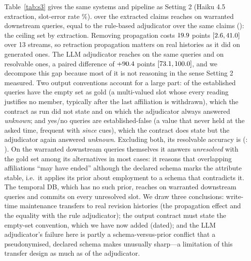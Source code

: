 Table~\ref{tab:s3} gives the same systems and pipeline as Setting 2 (Haiku 4.5 extraction, slot-error rate \sThreeExtSlot\%). \pal{} over the extracted claims reaches \sThreePalWarr{} on warranted downstream queries, equal to the rule-based adjudicator over the same claims (\sThreeRuleWarr): the ceiling set by extraction. Removing propagation costs $19.9$ points $[2.6, 41.0]$ over 13 streams, so retraction propagation matters on real histories as it did on generated ones. The LLM adjudicator reaches \sThreeLogWarr{} on the same queries and \sThreeLogRes{} on resolvable ones, a paired difference of $+90.4$ points $[73.1, 100.0]$, and we decompose this gap because most of it is not reasoning in the sense Setting 2 measured. Two output conventions account for a large part: \sThreeEstEmpty{} of the \sThreeEstTotal{} established queries have the empty set as gold (a multi-valued slot whose every reading justifies no member, typically after the last affiliation is withdrawn), which the contract as run did not state and on which the adjudicator always answered \emph{unknown}; and \sThreeHoldsFalse{} yes/no queries are established-false (a value that never held at the asked time, frequent with \emph{since} cues), which the contract does state but the adjudicator again answered \emph{unknown}. Excluding both, its resolvable accuracy is \sThreeLogResNe{} (\pal: \sThreePalResNe). On the warranted downstream queries themselves it answers \emph{unresolved} with the gold set among its alternatives in most cases: it reasons that overlapping affiliations ``may have ended'' although the declared schema marks the attribute stable, i.e.\ it applies its prior about employment to a schema that contradicts it. The temporal DB, which has no such prior, reaches \sThreeTdbWarr{} on warranted downstream queries and commits on every unresolved slot. We draw three conclusions: write-time maintenance transfers to real revision histories (the propagation effect and the equality with the rule adjudicator); the output contract must state the empty-set convention, which we have now added (dated); and the LLM adjudicator's failure here is partly a schema-versus-prior conflict that a pseudonymised, declared schema makes unusually sharp---a limitation of this transfer design as much as of the adjudicator.

